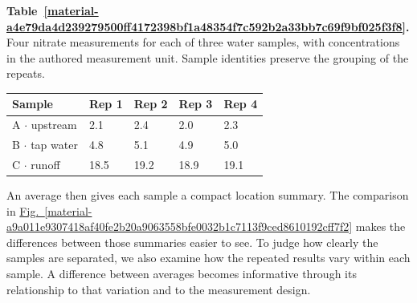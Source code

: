 \documentclass[11pt,a4paper]{article}
\newcounter{scripttable}
\begin{document}
\par\medskip
{}
\label{material-a4e79da4d239279500ff4172398bf1a48354f7c592b2a33bb7c69f9bf025f3f8}
\noindent\textbf{Table~\ref*{material-a4e79da4d239279500ff4172398bf1a48354f7c592b2a33bb7c69f9bf025f3f8}.} Four nitrate measurements for each of three water samples, with concentrations in the authored measurement unit. Sample identities preserve the grouping of the repeats.\par\nopagebreak
\begin{longtable}{@{}p{}p{}p{}p{}p{}@{}}
Sample & Rep 1 & Rep 2 & Rep 3 & Rep 4 \\ \hline
\endhead
A \ensuremath{\cdot} upstream & 2.1 & 2.4 & 2.0 & 2.3 \\ \hline
B \ensuremath{\cdot} tap water & 4.8 & 5.1 & 4.9 & 5.0 \\ \hline
C \ensuremath{\cdot} runoff & 18.5 & 19.2 & 18.9 & 19.1 \\ \hline
\end{longtable}
\medskip

An average then gives each sample a compact location summary. The comparison in \hyperref[material-a9a011e9307418af40fe2b20a9063558bfe0032b1c7113f9ced8610192cff7f2]{Fig.~\ref*{material-a9a011e9307418af40fe2b20a9063558bfe0032b1c7113f9ced8610192cff7f2}} makes the differences between those summaries easier to see. To judge how clearly the samples are separated, we also examine how the repeated results vary within each sample. A difference between averages becomes informative through its relationship to that variation and to the measurement design.
\end{document}
